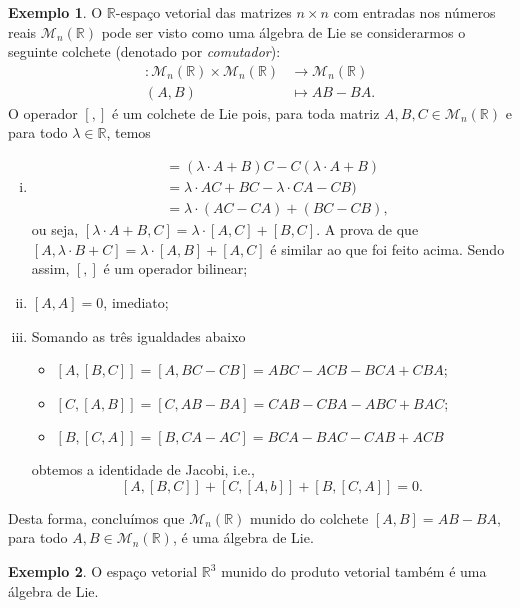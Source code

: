 \documentclass[twoside,openright,titlepage,numbers=noenddot,headinclude,  lineheaders footinclude=true,cleardoublepage=empty,
                                BCOR=5mm,paper=a4,fontsize=12pt ]{scrbook}
\theoremstyle{definition}
\newtheorem{exmp}{Exemplo}[section]
\begin{document}
\begin{exmp}
O $\mathbb{R}$-espaço vetorial das matrizes $n \times n$ com entradas nos números reais
$\mathcal{M}_n( \mathbb{R} )$ pode ser visto
como uma álgebra de Lie se considerarmos o seguinte colchete (denotado por \textit{comutador}): 
\begin{align*}
[,]: \mathcal{M}_n( \mathbb{R} ) \times \mathcal{M}_n( \mathbb{R} ) & \rightarrow \mathcal{M}_n( \mathbb{R} )\\
(A, B) & \mapsto AB - BA.
\end{align*}
O operador $[,]$ é um colchete de Lie pois, para toda matriz $A, B, C \in \mathcal{M}_n( \mathbb{R} )$
 e para todo $\lambda \in \mathbb{R}$, temos
\begin{enumerate}[(i)]
	\item \begin{align*}
			[ \lambda \cdot A + B, C] &= (\lambda \cdot A + B)C - C( \lambda \cdot A + B )\\
					       &= \lambda \cdot AC + BC - \lambda \cdot CA - CB )\\
					       &= \lambda \cdot ( AC - CA) + (BC - CB ),
		\end{align*}
		ou seja, $[\lambda \cdot A + B, C] = \lambda \cdot [A , C] + [B, C]$. A prova de que 
		$[ A,  \lambda \cdot B + C] = \lambda \cdot [A , B] + [A, C]$ é similar ao que foi feito acima. Sendo assim,
		$[,]$ é um operador bilinear;
	\item $[A, A] = 0$, imediato;
	\item Somando as três igualdades abaixo
		\begin{itemize}
			\item $[A, [B, C]] = [A, BC - CB] = ABC - ACB -BCA + CBA$;
			\item $[C, [A, B]] = [C, AB - BA] = CAB - CBA -ABC + BAC$;
			\item $[B, [C, A]] = [B, CA - AC] = BCA - BAC -CAB + ACB$
		\end{itemize}
		obtemos a identidade de Jacobi, i.e.,
		\[ [A, [B, C]] + [C, [A, b]] + [B, [C, A]] = 0.\]
\end{enumerate}
Desta forma, concluímos que $\mathcal{M}_n( \mathbb{R} )$ munido do colchete $[A,B] = AB -BA$, 
para todo $A, B \in \mathcal{M}_n( \mathbb{R} )$, é uma álgebra de Lie.
\end{exmp}

\begin{exmp}\label{algNOTideal}
O espaço vetorial $\mathbb{R}^3$ munido do produto vetorial também é uma álgebra de Lie.
\end{exmp}
\end{document}
